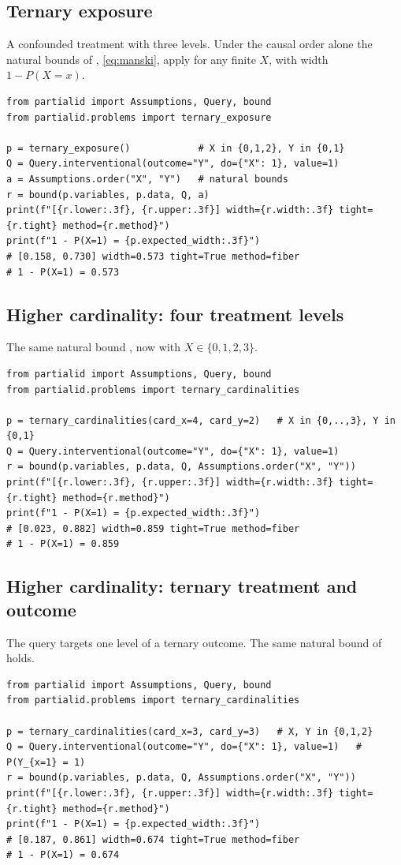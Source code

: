 \subsection{Ternary exposure}
\label{app:code-ternary}

A confounded treatment with three levels. Under the causal order alone the
natural bounds of \citet{manski1990nonparametric}, \eqref{eq:manski}, apply
for any finite $X$, with width $1-P(X{=}x)$.
\begin{lstlisting}
from partialid import Assumptions, Query, bound
from partialid.problems import ternary_exposure

p = ternary_exposure()            # X in {0,1,2}, Y in {0,1}
Q = Query.interventional(outcome="Y", do={"X": 1}, value=1)
a = Assumptions.order("X", "Y")   # natural bounds
r = bound(p.variables, p.data, Q, a)
print(f"[{r.lower:.3f}, {r.upper:.3f}] width={r.width:.3f} tight={r.tight} method={r.method}")
print(f"1 - P(X=1) = {p.expected_width:.3f}")
# [0.158, 0.730] width=0.573 tight=True method=fiber
# 1 - P(X=1) = 0.573
\end{lstlisting}

\subsection{Higher cardinality: four treatment levels}
\label{app:code-card42}

The same natural bound \citep{manski1990nonparametric}, now with $X\in\{0,1,2,3\}$.
\begin{lstlisting}
from partialid import Assumptions, Query, bound
from partialid.problems import ternary_cardinalities

p = ternary_cardinalities(card_x=4, card_y=2)   # X in {0,..,3}, Y in {0,1}
Q = Query.interventional(outcome="Y", do={"X": 1}, value=1)
r = bound(p.variables, p.data, Q, Assumptions.order("X", "Y"))
print(f"[{r.lower:.3f}, {r.upper:.3f}] width={r.width:.3f} tight={r.tight} method={r.method}")
print(f"1 - P(X=1) = {p.expected_width:.3f}")
# [0.023, 0.882] width=0.859 tight=True method=fiber
# 1 - P(X=1) = 0.859
\end{lstlisting}

\subsection{Higher cardinality: ternary treatment and outcome}
\label{app:code-card33}

The query targets one level of a ternary outcome. The same natural bound
of \citet{manski1990nonparametric} holds.
\begin{lstlisting}
from partialid import Assumptions, Query, bound
from partialid.problems import ternary_cardinalities

p = ternary_cardinalities(card_x=3, card_y=3)   # X, Y in {0,1,2}
Q = Query.interventional(outcome="Y", do={"X": 1}, value=1)   # P(Y_{x=1} = 1)
r = bound(p.variables, p.data, Q, Assumptions.order("X", "Y"))
print(f"[{r.lower:.3f}, {r.upper:.3f}] width={r.width:.3f} tight={r.tight} method={r.method}")
print(f"1 - P(X=1) = {p.expected_width:.3f}")
# [0.187, 0.861] width=0.674 tight=True method=fiber
# 1 - P(X=1) = 0.674
\end{lstlisting}

